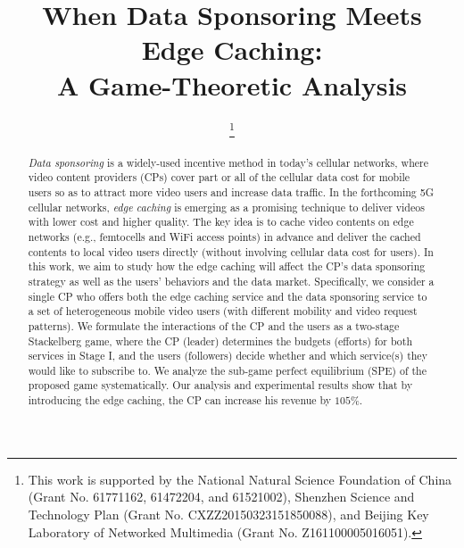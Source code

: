 \documentclass[10 pt, conference]{IEEEtran}
\begin{document}
\title{When Data Sponsoring Meets Edge Caching: \\ A Game-Theoretic Analysis}


\IEEEoverridecommandlockouts

\author{
\thanks{This work is supported by the National Natural Science Foundation of China (Grant No. 61771162, 61472204, and 61521002), Shenzhen Science and Technology Plan (Grant No. CXZZ20150323151850088), and Beijing Key Laboratory of Networked Multimedia (Grant No. Z161100005016051).}
\vspace{-8mm}
}



\maketitle

\begin{abstract}
\emph{Data sponsoring} is a widely-used incentive method in today's cellular networks, where video content providers (CPs) cover part or all of the cellular data cost for mobile users so as to attract more video users and increase data traffic.
In the forthcoming 5G cellular networks, \emph{edge caching} is emerging as a promising technique to deliver videos with lower cost and higher quality. The key idea is to cache video contents on edge networks (e.g., femtocells and WiFi access points) in advance and deliver the cached contents to local video users directly (without involving cellular data cost for users).
In this work, we aim to study how the edge caching will affect the CP's data sponsoring strategy as well as the users' behaviors and the data market.
Specifically, we consider a single CP who offers both the edge caching service and the data sponsoring service to a set of heterogeneous mobile video users (with different mobility and video request patterns).
We formulate the interactions of the CP and the users as a two-stage Stackelberg game, where the CP (leader) determines the budgets (efforts) for both services in Stage I, and the users (followers) decide whether and which service(s) they would like to subscribe to.
We analyze the sub-game perfect equilibrium (SPE) of the proposed game systematically.
Our analysis and experimental results show that by introducing the edge caching, the CP can increase his revenue by $105\%$.
\end{abstract}
\end{document}
